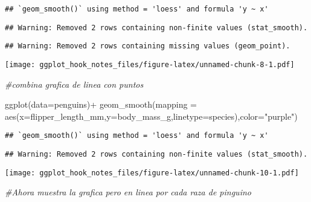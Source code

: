 \documentclass[
]{article}
\newenvironment{Shaded}{\begin{snugshade}}{\end{snugshade}}
\newcommand{\AttributeTok}[1]{\textcolor[rgb]{0.77,0.63,0.00}{#1}}
\newcommand{\CommentTok}[1]{\textcolor[rgb]{0.56,0.35,0.01}{\textit{#1}}}
\newcommand{\FunctionTok}[1]{\textcolor[rgb]{0.00,0.00,0.00}{#1}}
\newcommand{\NormalTok}[1]{#1}
\newcommand{\SpecialCharTok}[1]{\textcolor[rgb]{0.00,0.00,0.00}{#1}}
\newcommand{\StringTok}[1]{\textcolor[rgb]{0.31,0.60,0.02}{#1}}
\begin{document}
\begin{verbatim}
## `geom_smooth()` using method = 'loess' and formula 'y ~ x'
\end{verbatim}

\begin{verbatim}
## Warning: Removed 2 rows containing non-finite values (stat_smooth).
\end{verbatim}

\begin{verbatim}
## Warning: Removed 2 rows containing missing values (geom_point).
\end{verbatim}

\texttt{[image: ggplot\_hook\_notes\_files/figure-latex/unnamed-chunk-8-1.pdf]}

\begin{Shaded}
\begin{Highlighting}[]
\CommentTok{\#combina grafica de linea con puntos}
\end{Highlighting}
\end{Shaded}

\begin{Shaded}
\begin{Highlighting}[]
\FunctionTok{ggplot}\NormalTok{(}\AttributeTok{data=}\NormalTok{penguins)}\SpecialCharTok{+}
  \FunctionTok{geom\_smooth}\NormalTok{(}\AttributeTok{mapping =} \FunctionTok{aes}\NormalTok{(}\AttributeTok{x=}\NormalTok{flipper\_length\_mm,}\AttributeTok{y=}\NormalTok{body\_mass\_g,}\AttributeTok{linetype=}\NormalTok{species),}\AttributeTok{color=}\StringTok{"purple"}\NormalTok{)}
\end{Highlighting}
\end{Shaded}

\begin{verbatim}
## `geom_smooth()` using method = 'loess' and formula 'y ~ x'
\end{verbatim}

\begin{verbatim}
## Warning: Removed 2 rows containing non-finite values (stat_smooth).
\end{verbatim}

\texttt{[image: ggplot\_hook\_notes\_files/figure-latex/unnamed-chunk-10-1.pdf]}

\begin{Shaded}
\begin{Highlighting}[]
\CommentTok{\#Ahora muestra la grafica pero en linea por cada raza de pinguino}
\end{Highlighting}
\end{Shaded}
\end{document}
